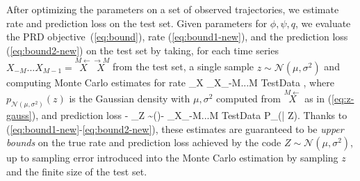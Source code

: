 \documentclass[entropy,article,submit,moreauthors,pdftex,10pt,a4paper]{Definitions/mdpi}
\newcommand{\finitefuture}{\stackrel{\rightarrow \scriptscriptstyle{M}}{X}}
\newcommand{\finitepast}{\stackrel{\scriptscriptstyle{M}\leftarrow}{X}}%
\let\oldequation\equation
\let\oldendequation\endequation
\renewenvironment{equation}
  {\linenomathNonumbers\oldequation}
  {\oldendequation\endlinenomath}
\begin{document}
After optimizing the parameters on a set of observed trajectories, we estimate rate and prediction loss on the test set.
Given parameters for $\phi, \psi, q$, we evaluate the PRD objective~(\ref{eq:bound}), rate (\ref{eq:bound1-new}), and the prediction loss (\ref{eq:bound2-new}) on the test set by taking, for each time series $X_{-M}...X_{M-1} = \finitepast\finitefuture$ from the test set, a single sample $z  \sim \mathcal{N}(\mu, \sigma^2)$ and computing Monte Carlo estimates for rate
\begin{equation}\label{eq:bound-mc-rate}
_{X}\left[ \operatorname{D_{KL}}\infdivx{P_\phi(Z|\finitepast)}{q(Z)}\right] \approx	{}	\sum_{X_{-M...M} \in TestData}  \log {},
\end{equation}
where $p_{\mathcal{N}(\mu, \sigma^2)}(z)$ is the Gaussian density with $\mu, \sigma^2$ computed from $\finitepast$ as in (\ref{eq:z-gauss}), and prediction loss 
\begin{equation}\label{eq:bound-mc-distortion}
 -	_{Z \sim \phi(\finitepast)}\left[\log P_\psi(\finitefuture | Z)\right] \approx - 	\sum_{X_{-M...M} \in TestData}	\log P_\psi(\finitefuture | Z).
\end{equation}
Thanks to (\ref{eq:bound1-new}-\ref{eq:bound2-new}), these estimates are guaranteed to be \emph{upper bounds} on the true rate and prediction loss achieved by the code $Z  \sim \mathcal{N}(\mu, \sigma^2)$, up to sampling error introduced into the Monte Carlo estimation by sampling $z$ and the finite size of the test set.


\end{document}
